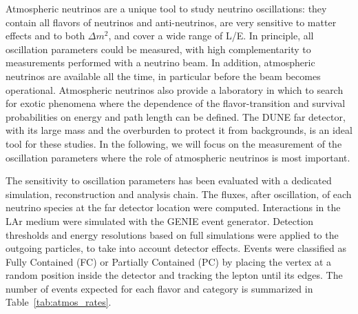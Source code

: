Atmospheric neutrinos are a unique tool to study neutrino oscillations: they 
contain all flavors of neutrinos and anti-neutrinos, are very sensitive to 
matter effects and to both $\Delta m^2$, and cover a wide range of L/E. In principle, 
all oscillation parameters could be measured, with high complementarity to 
measurements performed with a neutrino beam. In addition, atmospheric 
neutrinos are available all the time, in particular before the beam becomes 
operational. Atmospheric neutrinos also provide a laboratory in which to search 
for exotic phenomena where the dependence of the flavor-transition and survival 
probabilities on energy and path length can be defined. The DUNE far detector, 
with its large mass and the overburden to protect it from backgrounds, is an 
ideal tool for these studies. In the following, we will focus on the 
measurement of the oscillation parameters where the role of atmospheric neutrinos is 
most important. 

The sensitivity to oscillation parameters has been evaluated with a 
dedicated simulation, reconstruction and analysis chain. 
The fluxes, after 
oscillation, of each neutrino species at the far detector location were 
computed. Interactions in the LAr medium were simulated with the GENIE event 
generator. Detection thresholds and energy resolutions based on full 
simulations were applied to the outgoing particles, to take into account 
detector effects. Events were classified as Fully Contained (FC) or 
Partially Contained (PC) by placing the vertex at a random position inside the 
detector and tracking the lepton until its edges. The number of events expected 
for each flavor and category is summarized in Table~\ref{tab:atmos_rates}.

%
\begin{table}[!htbp]
\caption[Atmospheric-neutrino event rates]
        {
         Atmospheric-neutrino event rates including oscillations in \SI{350}{\ktyr} 
         with a LArTPC, fully or partially contained in the detector fiducial volume. 
        }
\begin{center}
\end{center}
\label{tab:atmos_rates}
\end{table}
%

